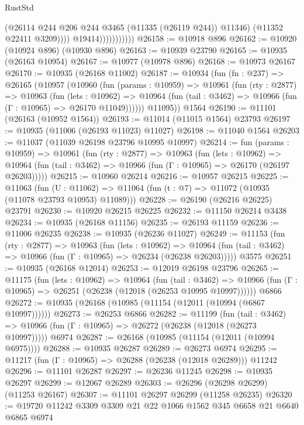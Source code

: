 \begin{lexlean}{RustStd}
\begin{coremodule}
{{{{{{{{{{{{{{{{{{{                                (@26114 @244 @206 @244 @3465 (@11335 (@26119 @244)) @11346)
                                (@11352 @22411 @3209))))
                          @19414)))))))))))
@26158 := @10918 @896
@26162 := @10920 (@10924 @896) (@10930 @896)
@26163 := @10939 @23790
@26165 := @10935 (@26163 @10954)
@26167 := @10977 (@10978 @896)
@26168 := @10973 @26167
@26170 := @10935 (@26168 @11002)
@26187 := @10934
    (fun (fn : @237) =>
    @26165
      (@10957
        (@10960
          (fun (params : @10959) =>
          @10961
            (fun (rty : @2877) =>
            @10963
              (fun (lets : @10962) =>
              @10964 (fun (tail : @3462) => @10966 (fun (Γ : @10965) => @26170 @11049))))))
        @11095))
    @1564
@26190 := @11101 (@26163 (@10952 @1564))
@26193 := @11014 (@11015 @1564) @23793
@26197 := @10935 (@11006 (@26193 @11023) @11027)
@26198 := @11040 @1564
@26203 := @11037 (@11039 @26198 @23796 @10995 @10997)
@26214 := fun (params : @10959) =>
  @10961
    (fun (rty : @2877) =>
    @10963
      (fun (lets : @10962) =>
      @10964 (fun (tail : @3462) => @10966 (fun (Γ : @10965) => @26170 (@26197 @26203)))))
@26215 := @10960 @26214
@26216 := @10957 @26215
@26225 := @11063
    (fun (U : @11062) => @11064 (fun (t : @7) => @11072 (@10935 (@11078 @23793 @10953) @11089)))
@26228 := @26190 (@26216 @26225) @23791
@26230 := @10920 @26215 @26225
@26232 := @11150 @26214 @3438
@26234 := @10935 (@26168 @11156)
@26235 := @26193 @11159
@26236 := @11006 @26235
@26238 := @10935 (@26236 @11027)
@26249 := @11153
    (fun (rty : @2877) =>
    @10963
      (fun (lets : @10962) =>
      @10964 (fun (tail : @3462) => @10966 (fun (Γ : @10965) => @26234 (@26238 @26203)))))
    @3575
@26251 := @10935 (@26168 @12014)
@26253 := @12019 @26198 @23796
@26265 := @11175
    (fun (lets : @10962) =>
    @10964
      (fun (tail : @3462) =>
      @10966 (fun (Γ : @10965) => @26251 (@26238 (@12018 (@26253 @10995 @10997))))))
    @6866
@26272 := @10935 (@26168 (@10985 (@11154 (@12011 (@10994 (@6867 @10997))))))
@26273 := @26253 @6866
@26282 := @11199
    (fun (tail : @3462) => @10966 (fun (Γ : @10965) => @26272 (@26238 (@12018 (@26273 @10997)))))
    @6974
@26287 := @26168 (@10985 (@11154 (@12011 (@10994 @6975))))
@26288 := @10935 @26287
@26289 := @26273 @6974
@26295 := @11217 (fun (Γ : @10965) => @26288 (@26238 (@12018 @26289))) @11242
@26296 := @11101 @26287
@26297 := @26236 @11245
@26298 := @10935 @26297
@26299 := @12067 @26289
@26303 := @26296 (@26298 @26299) (@11253 @26167)
@26307 := @11101 @26297 @26299 (@11258 @26235)
@26320 := @19720 @11242 @3309 @3309 @21 @22 @1066 @1562 @345 @6658 @21 @6640 @6865 @6974
}}}}}}}}}}}}}}}}}}}
\end{coremodule}
\end{lexlean}

